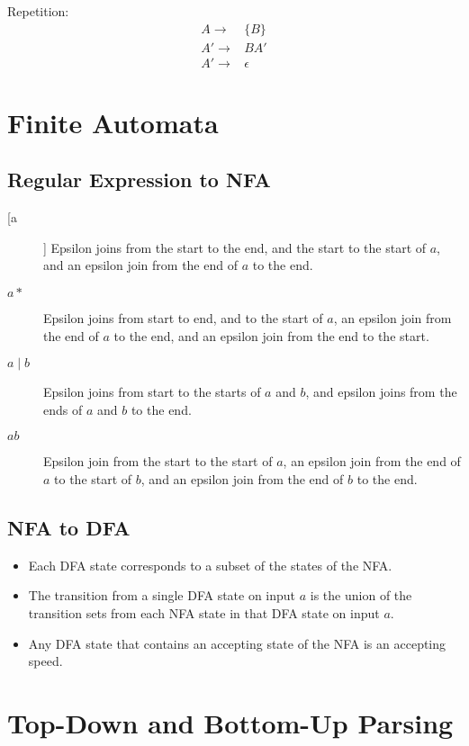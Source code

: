 \documentclass[landscape]{cheat}
\begin{document}
\begin{multicols}{3}
Repetition:
\begin{align*}
A \rightarrow& \{ B \} \\
A' \rightarrow& B A' \\
A' \rightarrow& \epsilon
\end{align*}

\section{Finite Automata}
\subsection{Regular Expression to NFA}
\begin{description}
\item[[a]] Epsilon joins from the start to the end, and the start to the start of $a$, and an epsilon join from the end of $a$ to the end.
\item[$a*$] Epsilon joins from start to end, and to the start of $a$, an epsilon join from the end of $a$ to the end, and an epsilon join from the end to the start.
\item[$a \mid b$] Epsilon joins from start to the starts of $a$ and $b$, and epsilon joins from the ends of $a$ and $b$ to the end.
\item[$ab$] Epsilon join from the start to the start of $a$, an epsilon join from the end of $a$ to the start of $b$, and an epsilon join from the end of $b$ to the end.
\end{description}

\subsection{NFA to DFA}
\begin{itemize}
\item Each DFA state corresponds to a subset of the states of the NFA.
\item The transition from a single DFA state on input $a$ is the union of the transition sets from each NFA state in that DFA state on input $a$.
\item Any DFA state that contains an accepting state of the NFA is an accepting speed.
\end{itemize}

\section{Top-Down and Bottom-Up Parsing}

\end{multicols}
\end{document}
